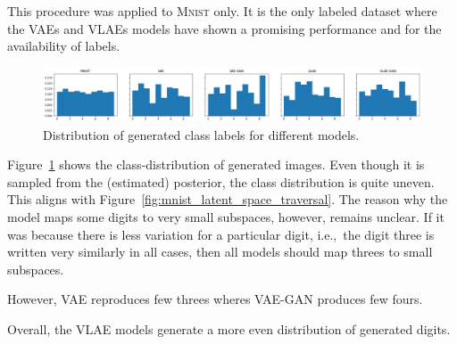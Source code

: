 This procedure was applied to \textsc{Mnist} only.
It is the only labeled dataset where the \acp{VAE} and \acp{VLAE} models have shown a promising performance and for the availability of labels.

\begin{figure}
    \centering
    \includegraphics[width=\textwidth]{images/generated_vs_true/mnist/class_distr.png}
    \caption{Distribution of generated class labels for different models.}
    \label{fig:generated_class_distribution}
\end{figure}

Figure~\ref{fig:generated_class_distribution} shows the class-distribution of generated images.
Even though it is sampled from the (estimated) posterior, the class distribution is quite uneven.
This aligns with Figure~\ref{fig:mnist_latent_space_traversal}.
The reason why the model maps some digits to very small subspaces, however, remains unclear.
If it was because there is less variation for a particular digit, i.e.,~the digit three is written very similarly in all cases, then all models should map threes to small subspaces.

However, \ac{VAE} reproduces few threes wheres \ac{VAE}-\ac{GAN} produces few fours.

Overall, the \ac{VLAE} models generate a more even distribution of generated digits.

